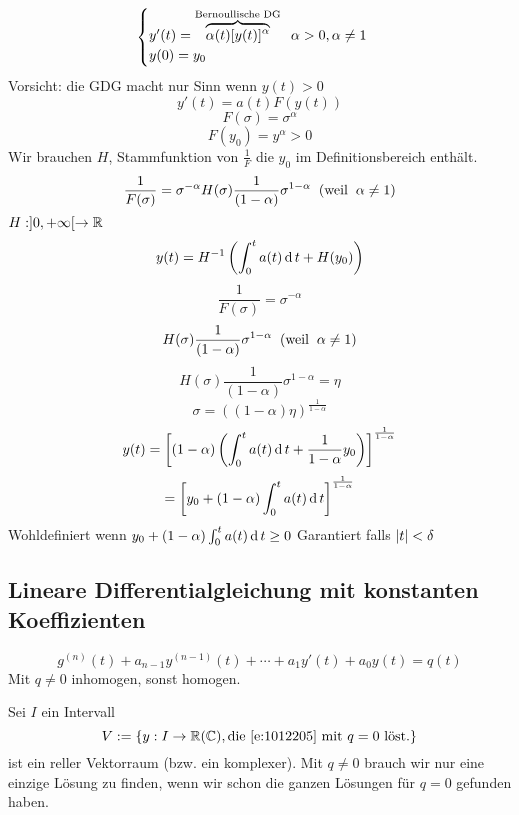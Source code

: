 \begin{Bsp}
  \[\begin{cases}
    y'(t)=\overbrace{\alpha(t)[y(t)]^\alpha}^{\text{Bernoullische DG}}\hspace{2mm} \alpha>0, \alpha\neq 1\\
    y(0)=y_0
  \end{cases}\]
  Vorsicht: die GDG macht nur Sinn wenn $y(t)>0$
  \[y'(t)=a(t)F(y(t))\]
  \[F(\sigma)=\sigma^\alpha\]
  \[F(y_0)=y^\alpha>0\]
  Wir brauchen $H$, Stammfunktion von $\frac{1}{F}$ die $y_0$ im Definitionsbereich enthält.
  \[\frac{1}{F(\sigma)}=\sigma^{-\alpha}H(\sigma)\frac{1}{(1-\alpha)}\sigma^{1-\alpha}\hspace{2mm}(\text{weil}\hspace{2mm} \alpha\neq 1)\]
  $H:]0,+\infty [\to\mathbb{R}$
  \[y(t)=H^{-1}\left( \int_0^ta(t)\operatorname{d} t+H(y_0) \right)\]
  \[\frac{1}{F(\sigma)}=\sigma^{-\alpha}\]
  \[H(\sigma)\frac{1}{(1-\alpha)}\sigma^{1-\alpha}\hspace{2mm}(\text{weil}\hspace{2mm} \alpha\neq 1)\]
  \[H(\sigma)\frac{1}{(1-\alpha)}\sigma^{1-\alpha}=\eta\]
  \[\sigma=\left( (1-\alpha) \eta\right)^{\frac{1}{1-\alpha}}\]
  \[y(t)=\left[ (1-\alpha)\left( \int_0^ta(t)\operatorname{d} t +\frac{1}{1-\alpha}y_0\right) \right]^{\frac{1}{1-\alpha}}\]
  \[=\left[ y_0+(1-\alpha)\int_0^ta(t)\operatorname{d} t \right]^{\frac{1}{1-\alpha}}\]
  Wohldefiniert wenn $y_0+(1-\alpha)\int_0^ta(t)\operatorname{d} t\geq 0$ Garantiert falls $\mathopen| t \mathclose|<\delta$
\end{Bsp}
\subsection{Lineare Differentialgleichung mit konstanten Koeffizienten}
\begin{equation}
  \label{e:1012205}
  g^{(n)}(t)+a_{n-1}y^{(n-1)}(t)+\cdots+a_1y'(t)+a_0y(t)=q(t)
\end{equation}
Mit $q\neq 0$ inhomogen, sonst homogen.
\begin{Lem}
  Sei $I$ ein Intervall
  \[V:=\left\{ y:I\to\mathbb{R}(\mathbb{C}), \text{die \ref{e:1012205} mit $q=0$ löst.} \right\}\]
  ist ein reller Vektorraum (bzw. ein komplexer). Mit $q\neq 0$ brauch wir nur eine einzige Lösung zu finden, wenn wir schon die ganzen Lösungen für $q=0$ gefunden haben.
\end{Lem}
